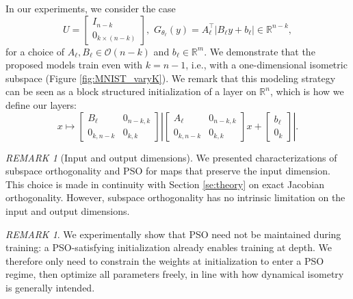 \documentclass{article}
\theoremstyle{plain}
\theoremstyle{definition}
\theoremstyle{definition}
\theoremstyle{remark}
\newtheorem{remark}[theorem]{REMARK}
\theoremstyle{definition}
\theoremstyle{definition}
\theoremstyle{remark}
\numberwithin{equation}{section}
\begin{document}
In our experiments, we consider the case
\[
U=\begin{bmatrix} I_{n-k} \\ 0_{k\times(n-k)}\end{bmatrix},\,\,
G_{\theta_{\ell}}(y) = A^\top_\ell |B_\ell y+b_\ell|\in\mathbb{R}^{n-k},
\]
for a choice of $A_\ell,B_\ell\in\mathcal{O}(n-k)$ and $b_\ell\in\mathbb{R}^m$. We demonstrate that the proposed models train even with $k=n-1$, i.e., with a one-dimensional isometric subspace (Figure \ref{fig:MNIST_varyK}). We remark that this modeling strategy can be seen as a block structured initialization of a layer on $\mathbb{R}^n$, which is how we define our layers:
\[
x \mapsto \begin{bmatrix} B_\ell & 0_{n-k, k}\\ 0_{k, n-k} & 0_{k, k} \end{bmatrix}\left |\begin{bmatrix} A_\ell & 0_{n-k, k}\\ 0_{k, n-k} & 0_{k, k} \end{bmatrix} x + \begin{bmatrix} b_\ell \\ 0_k \end{bmatrix} \right |.
\]
\begin{remark}[Input and output dimensions]
We presented characterizations of subspace orthogonality and PSO for maps that preserve the input dimension. This choice is made in continuity with Section \ref{se:theory} on exact Jacobian orthogonality. However, subspace orthogonality has no intrinsic limitation on the input and output dimensions.
\end{remark}
\begin{remark}
We experimentally show that PSO need not be maintained during training: a PSO-satisfying initialization already enables training at depth. We therefore only need to constrain the weights at initialization to enter a PSO regime, then optimize all parameters freely, in line with how dynamical isometry is generally intended.
\end{remark}
\end{document}
